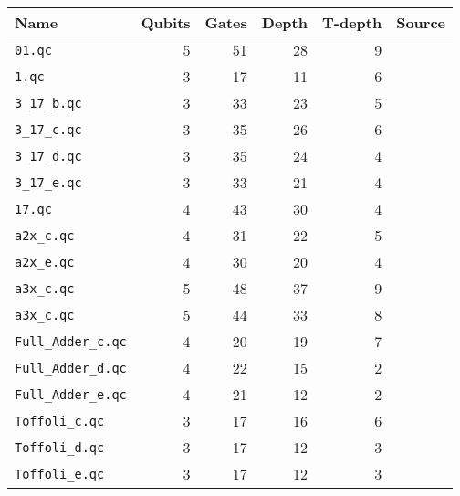 \documentclass{article}
\begin{document}
\begin{tabular}{|l|r|r|r|r|c|}
   \hline
   Name & Qubits & Gates & Depth & T-depth & Source \\ \hline  \hline
   {\tt 01.qc} & 5 & 51 & 28 & 9 & \cite{Qbench}  \\  \hline
   
   {\tt 1.qc} & 3 & 17 & 11 & 6 & \cite{Qbench}  \\  \hline
   
    {\tt 3\_17\_b.qc} & 3 & 33 & 23 & 5 & \cite{DBLP:conf/rc/MillerSD14}  \\  \hline
    {\tt 3\_17\_c.qc} & 3 & 35 & 26 & 6 & \cite{DBLP:conf/rc/MillerSD14}  \\  \hline
    {\tt 3\_17\_d.qc} & 3 & 35 & 24 & 4 & \cite{DBLP:conf/rc/MillerSD14}  \\  \hline
    {\tt 3\_17\_e.qc} & 3 & 33 & 21 & 4 & \cite{DBLP:conf/rc/MillerSD14}  \\  \hline
    
    {\tt 17.qc} & 4 & 43 & 30 & 4 & \cite{Qbench}  \\  \hline
    
    {\tt a2x\_c.qc} & 4 & 31 & 22 & 5 & \cite{DBLP:conf/rc/MillerSD14}  \\  \hline
    {\tt a2x\_e.qc} & 4 & 30 & 20 & 4 & \cite{DBLP:conf/rc/MillerSD14}  \\  \hline
    
    {\tt a3x\_c.qc} & 5 & 48 & 37 & 9 & \cite{DBLP:conf/rc/MillerSD14}  \\  \hline
    {\tt a3x\_c.qc} & 5 & 44 & 33 & 8 & \cite{DBLP:conf/rc/MillerSD14}  \\  \hline
    
   {\tt Full\_Adder\_c.qc} & 4 & 20 & 19 & 7 & \cite{DBLP:conf/rc/MillerSD14}  \\  \hline
   {\tt Full\_Adder\_d.qc} & 4 & 22 & 15 & 2 & \cite{DBLP:conf/rc/MillerSD14}  \\  \hline
   {\tt Full\_Adder\_e.qc} & 4 & 21 & 12 & 2 & \cite{DBLP:conf/rc/MillerSD14}  \\  \hline
   
   {\tt Toffoli\_c.qc} & 3 & 17 & 16 & 6 & \cite{DBLP:conf/rc/MillerSD14}  \\  \hline
   {\tt Toffoli\_d.qc} & 3 & 17 & 12 & 3 & \cite{DBLP:conf/rc/MillerSD14}  \\  \hline
   {\tt Toffoli\_e.qc} & 3 & 17 & 12 & 3 & \cite{DBLP:conf/rc/MillerSD14}  \\  \hline
  \end{tabular} 
  \vspace{5mm}
  
\end{document}
